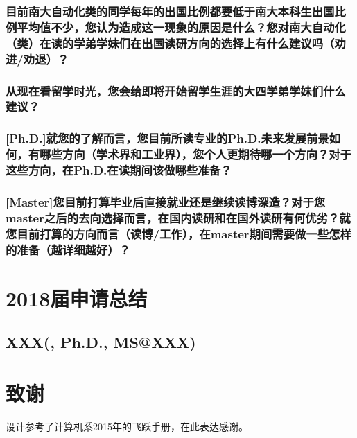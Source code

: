 \documentclass[a4paper,UTF8]{book}
\begin{document}
\subsection*{目前南大自动化类的同学每年的出国比例都要低于南大本科生出国比例平均值不少，您认为造成这一现象的原因是什么？您对南大自动化（类）在读的学弟学妹们在出国读研方向的选择上有什么建议吗（劝进/劝退）？}

\subsection*{从现在看留学时光，您会给即将开始留学生涯的大四学弟学妹们什么建议？}

\subsection*{[Ph.D.]就您的了解而言，您目前所读专业的Ph.D.未来发展前景如何，有哪些方向（学术界和工业界），您个人更期待哪一个方向？对于这些方向，在Ph.D.在读期间该做哪些准备？}

\subsection*{[Master]您目前打算毕业后直接就业还是继续读博深造？对于您master之后的去向选择而言，在国内读研和在国外读研有何优劣？就您目前打算的方向而言（读博/工作），在master期间需要做一些怎样的准备（越详细越好）？}



\chapter{2018届申请总结}

\newpage
\section{XXX(, Ph.D., MS@XXX)}



\chapter{致谢}
设计参考了计算机系2015年的飞跃手册，在此表达感谢。
\end{document}
